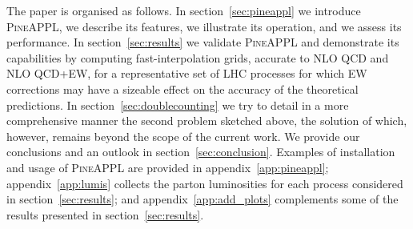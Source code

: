The paper is organised as follows. In section~\ref{sec:pineappl} we introduce
\textsc{PineAPPL}, we describe its features, we illustrate its operation, and we
assess its performance. In section~\ref{sec:results} we validate
\textsc{PineAPPL} and demonstrate its capabilities by computing fast-interpolation grids, accurate to NLO QCD and NLO QCD+EW, for a representative
set of LHC processes for which EW corrections may
have a sizeable effect on the accuracy of the theoretical predictions.
In section~\ref{sec:doublecounting} we try to detail in a more
comprehensive manner the second problem sketched above, the solution of which,
however, remains beyond the scope of the current work. We provide our
conclusions and an outlook in section~\ref{sec:conclusion}. Examples of
installation and usage of \textsc{PineAPPL} are provided in
appendix~\ref{app:pineappl}; appendix~\ref{app:lumis} collects the parton
luminosities for each process considered in section~\ref{sec:results}; and
appendix~\ref{app:add_plots} complements some of the results presented
in section~\ref{sec:results}.

